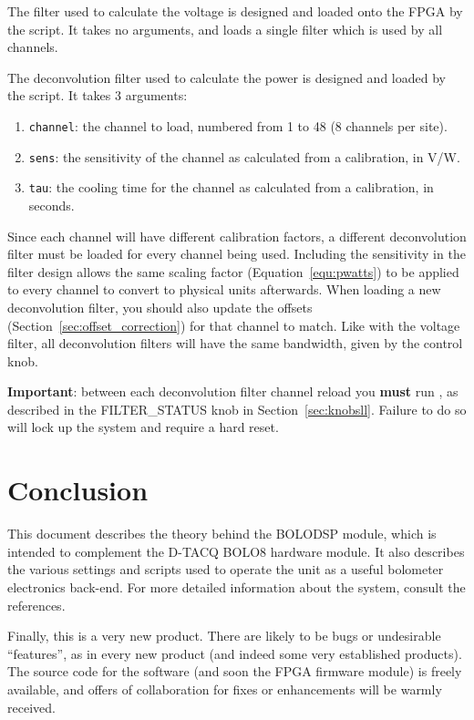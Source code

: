 \documentclass[12pt,a4paper]{article}
\begin{document}
The filter used to calculate the voltage is designed and loaded onto the FPGA by the \mbox{} script. It takes no
arguments, and loads a single filter which is used by all channels.

The deconvolution filter used to calculate the power is designed and loaded by the \mbox{} script. It takes 3
arguments:
\begin{enumerate}
\item{\texttt{channel}: the channel to load, numbered from 1 to 48 (8 channels per site).}
\item{\texttt{sens}: the sensitivity of the channel as calculated from a calibration, in V/W.}
\item{\texttt{tau}: the cooling time for the channel as calculated from a calibration, in seconds.}
\end{enumerate}
Since each channel will have different calibration factors, a different deconvolution filter must be loaded for every channel being used. Including the
sensitivity in the filter design allows the same scaling factor (Equation~\ref{equ:pwatts}) to be applied to every channel to convert to physical units
afterwards. When loading a new deconvolution filter, you should also update the offsets (Section~\ref{sec:offset_correction}) for that channel to
match. Like with the voltage filter, all deconvolution filters will have the same bandwidth, given by the control knob.

\textbf{Important}: between each deconvolution filter channel reload you \textbf{must} run \mbox{}, as described in
the FILTER{\_}STATUS knob in Section~\ref{sec:knobsll}. Failure to do so will lock up the system and require a hard reset.

\section{Conclusion}
This document describes the theory behind the BOLODSP module, which is intended to complement the D-TACQ BOLO8 hardware module. It also describes the
various settings and scripts used to operate the unit as a useful bolometer electronics back-end. For more detailed information about the system, consult
the references.

Finally, this is a very new product. There are likely to be bugs or undesirable ``features'', as in every new product (and indeed some very established
products). The source code for the software (and soon the FPGA firmware module) is freely available, and offers of collaboration for fixes or enhancements
will be warmly received.



\end{document}
